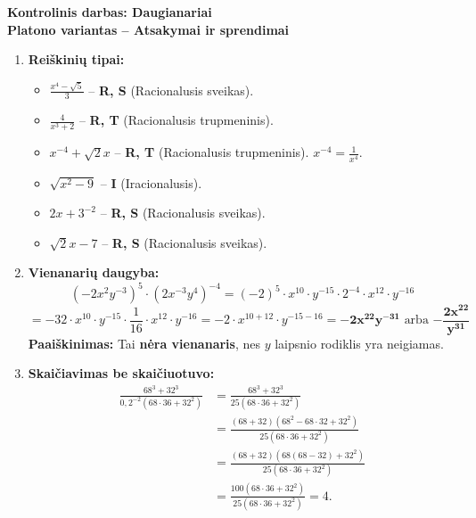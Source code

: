 \documentclass[12pt,a4paper]{article}
\begin{document}
\begin{center}
    {\Large \textbf{Kontrolinis darbas: Daugianariai}}\\[0.3cm]
    {\large \textbf{Platono variantas -- Atsakymai ir sprendimai}}
\end{center}
\vspace{0.5cm}

\begin{enumerate}
    \item \textbf{Reiškinių tipai:}
    \begin{itemize}
        \item[a)] $\displaystyle \frac{x^4 - \sqrt{5}}{3}$ -- \textbf{R, S} (Racionalusis sveikas). 
        \item[b)] $\displaystyle \frac{4}{x^3 + 2}$ -- \textbf{R, T} (Racionalusis trupmeninis).
        \item[c)] $\displaystyle x^{-4} + \sqrt{2} x$ -- \textbf{R, T} (Racionalusis trupmeninis). $x^{-4} = \frac{1}{x^4}$.
        \item[d)] $\displaystyle \sqrt{x^2 - 9}$ -- \textbf{I} (Iracionalusis).
        \item[e)] $\displaystyle 2x + 3^{-2}$ -- \textbf{R, S} (Racionalusis sveikas). 
        \item[f)] $\displaystyle \sqrt{2}x - 7$ -- \textbf{R, S} (Racionalusis sveikas).
    \end{itemize}

    \vspace{0.3cm}
    \item \textbf{Vienanarių daugyba:} \\
    $$ \left( -2x^2y^{-3} \right)^5 \cdot \left( 2x^{-3}y^4 \right)^{-4} = (-2)^5 \cdot x^{10} \cdot y^{-15} \cdot 2^{-4} \cdot x^{12} \cdot y^{-16} $$
    $$ = -32 \cdot x^{10} \cdot y^{-15} \cdot \frac{1}{16} \cdot x^{12} \cdot y^{-16} = -2 \cdot x^{10+12} \cdot y^{-15-16} = \mathbf{-2x^{22}y^{-31}} \text{ arba } \mathbf{-\frac{2x^{22}}{y^{31}}} $$
    \textbf{Paaiškinimas:} Tai \textbf{nėra vienanaris}, nes $y$ laipsnio rodiklis yra neigiamas.

    \vspace{0.3cm}
    \item \textbf{Skaičiavimas be skaičiuotuvo:} \\
    \begin{align*}
        \frac{68^3+32^3}
        {0,2^{-2}\left(68\cdot36+32^2\right)}
        &= \frac{68^3+32^3}
        {25\left(68\cdot36+32^2\right)} \\
        &= \frac{(68+32)\left(68^2-68\cdot32+32^2\right)}
        {25\left(68\cdot36+32^2\right)} \\
        &= \frac{(68+32)\left(68(68-32)+32^2\right)}
        {25\left(68\cdot36+32^2\right)} \\
        &= \frac{100\left(68\cdot36+32^2\right)}
        {25\left(68\cdot36+32^2\right)} = 4.
    \end{align*}


\end{enumerate}
\end{document}
